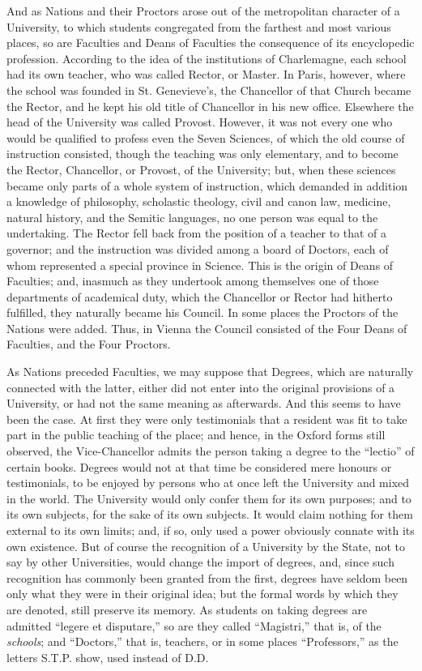 And as Nations and their
Proctors arose out of the metropolitan character of a University, to
which students congregated from the farthest and most various places,
so are Faculties and Deans of Faculties the consequence of its
encyclopedic profession. According to the idea of the institutions of
Charlemagne, each school had its own teacher, who was called Rector,
or Master. In Paris, however, where the school was founded in St.
Genevieve's, the Chancellor of that Church became the Rector, and he
kept his old title of Chancellor in his new office. Elsewhere the head
of the University was called Provost. However, it was not every one
who would be qualified to profess even the Seven Sciences, of which
the old course of instruction consisted, though the teaching was only
elementary, and to become the Rector, Chancellor, or Provost, of the
University; but, when these sciences became only parts of a whole
system of instruction, which demanded in addition a knowledge of
philosophy, scholastic theology, civil and canon law, medicine,
natural history, and the Semitic languages, no one person was equal to
the undertaking. The Rector fell back from the position of a teacher
to that of a governor; and the instruction was divided among a board
of Doctors, each of whom represented a special province in Science.
This is the origin of Deans of Faculties; and, inasmuch as they
undertook among themselves one of those departments of academical
duty, which the Chancellor or Rector had hitherto fulfilled, they
naturally became his Council. In some places the Proctors of the
Nations were added. Thus, in Vienna the Council consisted of the Four
Deans of Faculties, and the Four Proctors.

As Nations preceded Faculties,
we may suppose that Degrees, which are naturally connected with the
latter, either did not enter into the original provisions of a
University, or had not the same meaning as afterwards. And this seems
to have been the case. At first they were only testimonials that a
resident was fit to take part in the public teaching of the place; and
hence, in the Oxford forms still observed, the Vice-Chancellor admits
the person taking a degree to the ``lectio'' of certain books.
Degrees would not at that time be considered mere honours or
testimonials, to be enjoyed by persons who at once left the University
and mixed in the world. The University would only confer them for its
own purposes; and to its own subjects, for the sake of its own
subjects. It would claim nothing for them external to its own limits;
and, if so, only used a power obviously connate with its own
existence. But of course the recognition of a University by the State,
not to say by other Universities, would change the import of degrees,
and, since such recognition has commonly been granted from the first,
degrees have seldom been only what they were in their original idea;
but the formal words by which they are denoted, still preserve its
memory. As students on taking degrees are admitted ``legere et
disputare,'' so are they called ``Magistri,'' that is, of the \emph{schools};
and ``Doctors,'' that is, teachers, or in some places ``Professors,'' as the letters S.T.P. show, used instead of D.D.

